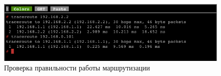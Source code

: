 \begin{figure}
  \centering
  \includegraphics[width=14cm]{fig/example-pc-traceroute.png}
  \caption{Проверка правильности работы маршрутизации}
  \label{fig:example-pc-traceroute}
\end{figure}



